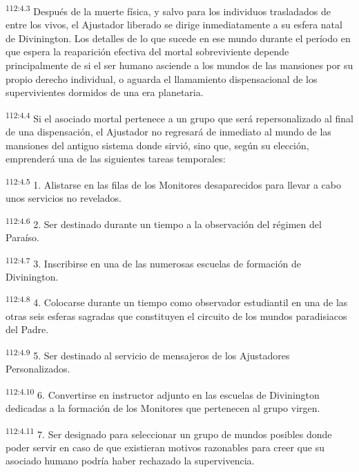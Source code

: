\par
\textsuperscript{112:4.3} Después de la muerte física, y salvo para los individuos trasladados de entre los vivos, el Ajustador liberado se dirige inmediatamente a su esfera natal de Divinington. Los detalles de lo que sucede en ese mundo durante el período en que espera la reaparición efectiva del mortal sobreviviente depende principalmente de si el ser humano asciende a los mundos de las mansiones por su propio derecho individual, o aguarda el llamamiento dispensacional de los supervivientes dormidos de una era planetaria.

\par
\textsuperscript{112:4.4} Si el asociado mortal pertenece a un grupo que será repersonalizado al final de una dispensación, el Ajustador no regresará de inmediato al mundo de las mansiones del antiguo sistema donde sirvió, sino que, según su elección, emprenderá una de las siguientes tareas temporales:

\par
\textsuperscript{112:4.5} 1. Alistarse en las filas de los Monitores desaparecidos para llevar a cabo unos servicios no revelados.

\par
\textsuperscript{112:4.6} 2. Ser destinado durante un tiempo a la observación del régimen del Paraíso.

\par
\textsuperscript{112:4.7} 3. Inscribirse en una de las numerosas escuelas de formación de Divinington.

\par
\textsuperscript{112:4.8} 4. Colocarse durante un tiempo como observador estudiantil en una de las otras seis esferas sagradas que constituyen el circuito de los mundos paradisiacos del Padre.

\par
\textsuperscript{112:4.9} 5. Ser destinado al servicio de mensajeros de los Ajustadores Personalizados.

\par
\textsuperscript{112:4.10} 6. Convertirse en instructor adjunto en las escuelas de Divinington dedicadas a la formación de los Monitores que pertenecen al grupo virgen.

\par
\textsuperscript{112:4.11} 7. Ser designado para seleccionar un grupo de mundos posibles donde poder servir en caso de que existieran motivos razonables para creer que su asociado humano podría haber rechazado la supervivencia.

